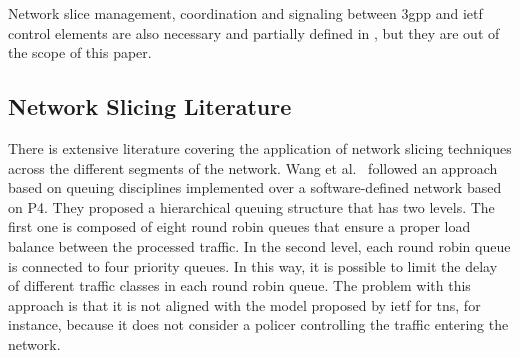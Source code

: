 Network slice management, coordination and signaling between \gls{3gpp} and \gls{ietf} control elements are also necessary and partially defined in \cite{rfc9543, draft-ietf-teas-5g-network-slice-application}, but they are out of the scope of this paper.

\subsection{Network Slicing Literature}
\label{subsec:soa-literature}
There is extensive literature covering the application of network slicing techniques across the different segments of the network. Wang et al.~\cite{Wang2019} followed an approach based on queuing disciplines implemented over a software-defined network based on P4. They proposed a hierarchical queuing structure that has two levels. The first one is composed of eight round robin queues that ensure a proper load balance between the processed traffic. In the second level, each round robin queue is connected to four priority queues. In this way, it is possible to limit the delay of different traffic classes in each round robin queue. The problem with this approach is that it is not aligned with the model proposed by \gls{ietf} for \glspl{tn}, for instance, because it does not consider a policer controlling the traffic entering the network.

